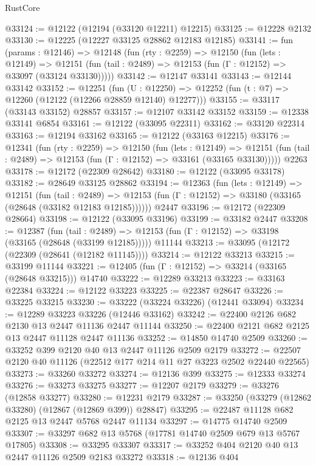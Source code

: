 \begin{lexlean}{RustCore}
\begin{coremodule}
@33124 := @12122 (@12194 (@33120 @12211) @12215)
@33125 := @12228 @2132
@33130 := @12225 (@12227 @33125 @28862 @12183 @12185)
@33141 := fun (params : @12146) =>
  @12148
    (fun (rty : @2259) =>
    @12150
      (fun (lets : @12149) =>
      @12151 (fun (tail : @2489) => @12153 (fun (Γ : @12152) => @33097 (@33124 @33130)))))
@33142 := @12147 @33141
@33143 := @12144 @33142
@33152 := @12251
    (fun (U : @12250) => @12252 (fun (t : @7) => @12260 (@12122 (@12266 @28859 @12140) @12277)))
@33155 := @33117 (@33143 @33152) @28857
@33157 := @12107 @33142 @33152
@33159 := @12338 @33141 @6854
@33161 := @12122 (@33095 @22311)
@33162 := @33120 @22314
@33163 := @12194 @33162
@33165 := @12122 (@33163 @12215)
@33176 := @12341
    (fun (rty : @2259) =>
    @12150
      (fun (lets : @12149) =>
      @12151 (fun (tail : @2489) => @12153 (fun (Γ : @12152) => @33161 (@33165 @33130)))))
    @2263
@33178 := @12172 (@22309 @28642)
@33180 := @12122 (@33095 @33178)
@33182 := @28649 @33125 @28862
@33194 := @12363
    (fun (lets : @12149) =>
    @12151
      (fun (tail : @2489) =>
      @12153 (fun (Γ : @12152) => @33180 (@33165 (@28648 (@33182 @12183 @12185))))))
    @2447
@33196 := @12172 (@22309 @28664)
@33198 := @12122 (@33095 @33196)
@33199 := @33182 @2447
@33208 := @12387
    (fun (tail : @2489) => @12153 (fun (Γ : @12152) => @33198 (@33165 (@28648 (@33199 @12185)))))
    @11144
@33213 := @33095 (@12172 (@22309 (@28641 (@12182 @11145))))
@33214 := @12122 @33213
@33215 := @33199 @11144
@33221 := @12405 (fun (Γ : @12152) => @33214 (@33165 (@28648 @33215))) @14740
@33222 := @12289 @33213
@33223 := @33163 @22384
@33224 := @12122 @33223
@33225 := @22387 @28647
@33226 := @33225 @33215
@33230 := @33222 (@33224 @33226) (@12441 @33094)
@33234 := @12289 @33223 @33226 (@12446 @33162)
@33242 := @22400 @2126 @682 @2130 @13 @2447 @11136 @2447 @11144
@33250 := @22400 @2121 @682 @2125 @13 @2447 @11128 @2447 @11136
@33252 := @14850 @14740 @2509
@33260 := @33252 @399 @2120 @40 @13 @2447 @11126 @2509 @2179
@33272 := @22507 @2120 @40 @11126 (@22512 @177 @214 @11 @27 @3223 @2502 @22440 @22565)
@33273 := @33260 @33272
@33274 := @12136 @399
@33275 := @12333 @33274
@33276 := @33273 @33275
@33277 := @12207 @2179
@33279 := @33276 (@12858 @33277)
@33280 := @12231 @2179
@33287 := @33250 (@33279 (@12862 @33280) (@12867 (@12869 @399)) @28847)
@33295 := @22487 @11128 @682 @2125 @13 @2447 @5768 @2447 @11134
@33297 := @14775 @14740 @2509
@33307 := @33297 @682 @13 @5768 (@17781 @14740 @2509 @679 @13 @5767 @17805)
@33308 := @33295 @33307
@33317 := @33252 @404 @2120 @40 @13 @2447 @11126 @2509 @2183 @33272
@33318 := @12136 @404

\end{coremodule}
\end{lexlean}
